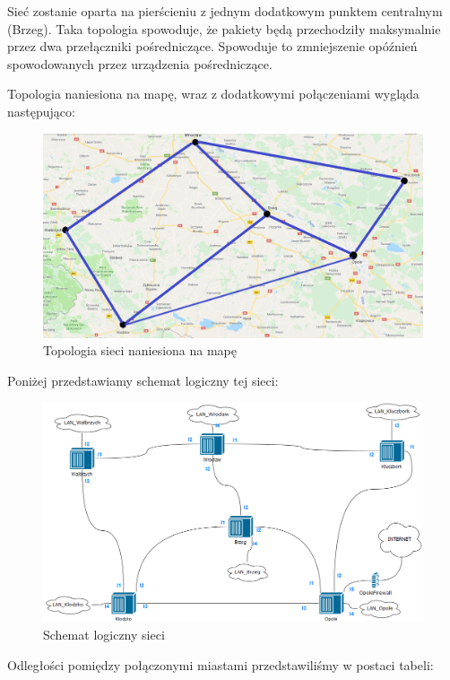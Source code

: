 \documentclass[a4paper]{article}
\begin{document}
Sieć zostanie oparta na pierścieniu z jednym dodatkowym punktem centralnym (Brzeg). Taka topologia spowoduje, że pakiety będą przechodziły maksymalnie przez dwa przełączniki pośredniczące. Spowoduje to zmniejszenie opóźnień spowodowanych przez urządzenia pośredniczące.

Topologia naniesiona na mapę, wraz z dodatkowymi połączeniami wygląda następująco:

\begin{figure}[H]
	\centering
	\includegraphics[width=0.75\linewidth]{mapa.png}
	\caption{Topologia sieci naniesiona na mapę}
	\label{mapa.png}
\end{figure}

Poniżej przedstawiamy schemat logiczny tej sieci:

\begin{figure}[H]
	\centering
	\includegraphics[width=1
    \linewidth]{diagram_sieci.png}
	\caption{Schemat logiczny sieci}
	\label{diagram_sieci.png}
\end{figure}

Odległości pomiędzy połączonymi miastami przedstawiliśmy w postaci tabeli:
\end{document}
